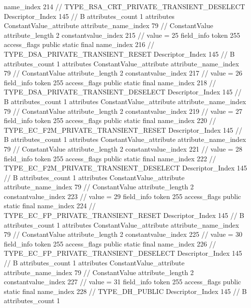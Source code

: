 {{{{{				name_index	214		// TYPE_RSA_CRT_PRIVATE_TRANSIENT_DESELECT
				Descriptor_Index	145		// B
				attributes_count	1
				attributes {
				ConstantValue_attribute {
					attribute_name_index	79		// ConstantValue
					attribute_length	2
					constantvalue_index	215		// value = 25
				}
				}
			}
			field_info {
				token	255
				access_flags	public static final
				name_index	216		// TYPE_DSA_PRIVATE_TRANSIENT_RESET
				Descriptor_Index	145		// B
				attributes_count	1
				attributes {
				ConstantValue_attribute {
					attribute_name_index	79		// ConstantValue
					attribute_length	2
					constantvalue_index	217		// value = 26
				}
				}
			}
			field_info {
				token	255
				access_flags	public static final
				name_index	218		// TYPE_DSA_PRIVATE_TRANSIENT_DESELECT
				Descriptor_Index	145		// B
				attributes_count	1
				attributes {
				ConstantValue_attribute {
					attribute_name_index	79		// ConstantValue
					attribute_length	2
					constantvalue_index	219		// value = 27
				}
				}
			}
			field_info {
				token	255
				access_flags	public static final
				name_index	220		// TYPE_EC_F2M_PRIVATE_TRANSIENT_RESET
				Descriptor_Index	145		// B
				attributes_count	1
				attributes {
				ConstantValue_attribute {
					attribute_name_index	79		// ConstantValue
					attribute_length	2
					constantvalue_index	221		// value = 28
				}
				}
			}
			field_info {
				token	255
				access_flags	public static final
				name_index	222		// TYPE_EC_F2M_PRIVATE_TRANSIENT_DESELECT
				Descriptor_Index	145		// B
				attributes_count	1
				attributes {
				ConstantValue_attribute {
					attribute_name_index	79		// ConstantValue
					attribute_length	2
					constantvalue_index	223		// value = 29
				}
				}
			}
			field_info {
				token	255
				access_flags	public static final
				name_index	224		// TYPE_EC_FP_PRIVATE_TRANSIENT_RESET
				Descriptor_Index	145		// B
				attributes_count	1
				attributes {
				ConstantValue_attribute {
					attribute_name_index	79		// ConstantValue
					attribute_length	2
					constantvalue_index	225		// value = 30
				}
				}
			}
			field_info {
				token	255
				access_flags	public static final
				name_index	226		// TYPE_EC_FP_PRIVATE_TRANSIENT_DESELECT
				Descriptor_Index	145		// B
				attributes_count	1
				attributes {
				ConstantValue_attribute {
					attribute_name_index	79		// ConstantValue
					attribute_length	2
					constantvalue_index	227		// value = 31
				}
				}
			}
			field_info {
				token	255
				access_flags	public static final
				name_index	228		// TYPE_DH_PUBLIC
				Descriptor_Index	145		// B
				attributes_count	1
}}}}}
